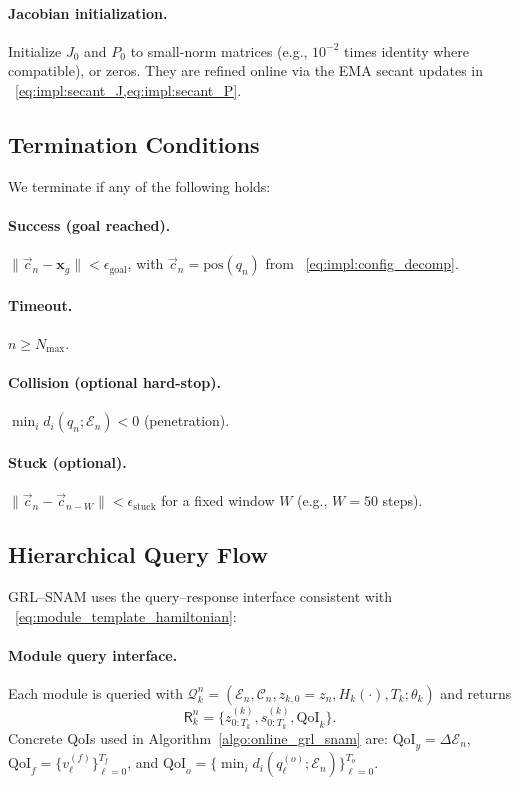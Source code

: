 \paragraph{Jacobian initialization.}
Initialize $J_0$ and $P_0$ to small-norm matrices (e.g., $10^{-2}$ times identity where compatible), or
zeros. They are refined online via the EMA secant updates in ~\cref{eq:impl:secant_J,eq:impl:secant_P}.

\subsection{Termination Conditions}
\label{subsec:termination}

We terminate if any of the following holds:

\paragraph{Success (goal reached).}
$\|\vec{c}_n-\mathbf{x}_g\|<\epsilon_{\text{goal}}$, with $\vec c_n=\mathrm{pos}(q_n)$ from ~\cref{eq:impl:config_decomp}.

\paragraph{Timeout.}
$n\ge N_{\max}$.

\paragraph{Collision (optional hard-stop).}
$\min_i d_i(q_n;\mathcal{E}_n)<0$ (penetration).

\paragraph{Stuck (optional).}
$\|\vec{c}_n-\vec{c}_{n-W}\|<\epsilon_{\text{stuck}}$ for a fixed window $W$ (e.g., $W{=}50$ steps).

\subsection{Hierarchical Query Flow}
\label{subsec:hierarchical_queries}

GRL--SNAM uses the query--response interface consistent with ~\cref{eq:module_template_hamiltonian}:

\paragraph{Module query interface.}
Each module is queried with $\mathcal{Q}_k^n=(\mathcal{E}_n,\mathcal{C}_n,z_{k,0}{=}z_n,H_k(\cdot),T_k;\theta_k)$ and returns
\[
\mathsf{R}_k^n=\{z_{0:T_k}^{(k)},s_{0:T_k}^{(k)},\mathrm{QoI}_k\}.
\]
Concrete QoIs used in Algorithm~\cref{algo:online_grl_snam} are:
$\mathrm{QoI}_y=\Delta\mathcal{E}_n$,
$\mathrm{QoI}_f=\{v_\ell^{(f)}\}_{\ell=0}^{T_f}$, and
$\mathrm{QoI}_o=\{\min_i d_i(q_\ell^{(o)};\mathcal{E}_n)\}_{\ell=0}^{T_o}$.

